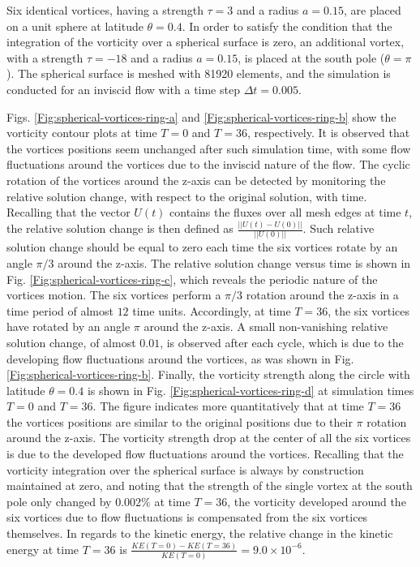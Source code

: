 \documentclass[final,12pt,times]{elsarticle}
\begin{document}
Six identical vortices, having a strength $\tau=3$ and a radius $a=0.15$, are placed on a unit sphere at latitude $\theta = 0.4$. In order to satisfy the condition that the integration of the vorticity over a spherical surface is zero, an additional vortex, with a strength $\tau = -18$ and a radius $a=0.15$, is placed at the south pole ($\theta = \pi$). The spherical surface is meshed with 81920 elements, and the simulation is conducted for an inviscid flow with a time step $\Delta t = 0.005$.

Figs. \ref{Fig:spherical-vortices-ring-a} and \ref{Fig:spherical-vortices-ring-b} show the vorticity contour plots at time $T=0$ and $T=36$, respectively. It is observed that the vortices positions seem unchanged after such simulation time, with some flow fluctuations around the vortices due to the inviscid nature of the flow. The cyclic rotation of the vortices around the z-axis can be detected by monitoring the relative solution change, with respect to the original solution, with time. Recalling that the vector $U(t)$ contains the fluxes over all mesh edges at time $t$, the relative solution change is then defined as $\frac{||U(t)-U(0)||}{||U(0)||}$. Such relative solution change should be equal to zero each time the six vortices rotate by an angle $\pi/3$ around the z-axis. The relative solution change versus time is shown in Fig. \ref{Fig:spherical-vortices-ring-c}, which reveals the periodic nature of the vortices motion. The six vortices perform a $\pi/3$ rotation around the z-axis in a time period of almost $12$ time units. Accordingly, at time $T=36$, the six vortices have rotated by an angle $\pi$ around the z-axis. A small non-vanishing relative solution change, of almost $0.01$, is observed after each cycle, which is due to the developing flow fluctuations around the vortices, as was shown in Fig. \ref{Fig:spherical-vortices-ring-b}. Finally, the vorticity strength along the circle with latitude $\theta = 0.4$ is shown in Fig. \ref{Fig:spherical-vortices-ring-d} at simulation times $T=0$ and $T=36$. The figure indicates more quantitatively that at time $T=36$ the vortices positions are similar to the original positions due to their $\pi$ rotation around the z-axis.  The vorticity strength drop at the center of all the six vortices is due to the developed flow fluctuations around the vortices. Recalling that the vorticity integration over the spherical surface is always by construction maintained at zero, and noting that the strength of the single vortex at the south pole only changed by $0.002 \%$ at time $T = 36$, the vorticity developed around the six vortices due to flow fluctuations is compensated from the six vortices themselves. In regards to the kinetic energy, the relative change in the kinetic energy at time $T=36$ is $\frac{KE(T=0) - KE(T=36)}{KE(T=0)} = 9.0 \times 10^{-6}$.                     
\end{document}
